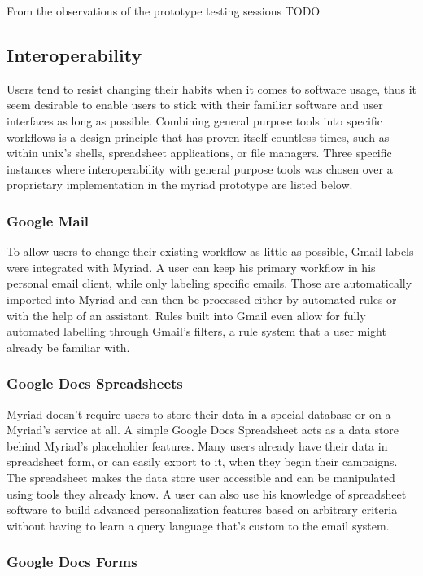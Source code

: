 From the observations of the prototype testing sessions TODO

\subsection{Interoperability}

Users tend to resist changing their habits when it comes to software usage, thus it seem desirable to enable users to stick with their familiar software and user interfaces as long as possible. Combining general purpose tools into specific workflows is a design principle that has proven itself countless times, such as within unix’s shells, spreadsheet applications, or file managers.
Three specific instances where interoperability with general purpose tools was chosen over a proprietary implementation in the myriad prototype are listed below.

\subsubsection{Google Mail}

To allow users to change their existing workflow as little as possible, Gmail labels were integrated with Myriad. A user can keep his primary workflow in his personal email client, while only labeling specific emails. Those are automatically imported into Myriad and can then be processed either by automated rules or with the help of an assistant. Rules built into Gmail even allow for fully automated labelling through Gmail’s filters, a rule system that a user might already be familiar with.

\subsubsection{Google Docs Spreadsheets}

Myriad doesn't require users to store their data in a special database or on a Myriad's service at all. A simple Google Docs Spreadsheet acts as a data store behind Myriad's placeholder features. Many users already have their data in spreadsheet form, or can easily export to it, when they begin their campaigns. The spreadsheet makes the data store user accessible and can be manipulated using tools they already know. A user can also use his knowledge of spreadsheet software to build advanced personalization features based on arbitrary criteria without having to learn a query language that's custom to the email system.

\subsubsection{Google Docs Forms}

